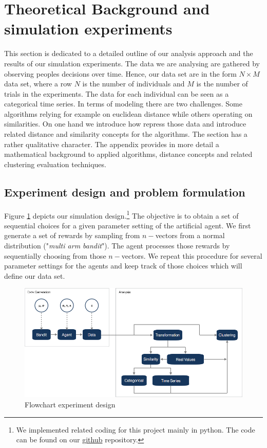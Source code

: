 \documentclass[12pt,a4paper,bibliography=totocnumbered,listof=totocnumbered]{scrartcl}
\begin{document}
\pagebreak

\section{Theoretical Background and simulation experiments}

This section is dedicated to a detailed outline of our analysis approach and the results of our simulation experiments. The data we are analysing are gathered by observing peoples decisions over time. Hence, our data set are in the form $N \times M$ data set, where a row $N$ is the number of individuals and $M$ is the number of trials in the experiments. The data for each individual can be seen as a categorical time series. In terms of modeling there are two challenges. Some algorithms relying for example on euclidean distance while others operating on similarities. On one hand we introduce how repress those data and introduce related distance and similarity concepts for the algorithms. The section has a rather qualitative character. The appendix provides in more detail a mathematical background to applied algorithms, distance concepts and related clustering evaluation techniques. 

\subsection{Experiment design and problem formulation}

Figure \ref{fig:flow} depicts our simulation design.\footnote{ We implemented related coding for this project mainly in python. The code can be found on our  \href{https://github.com/FelixGSE/Master-Project}{github} repository.} The objective is to obtain a set of sequential choices for a given parameter setting of the artificial agent. We first generate a set of rewards by sampling from $n-$vectors from a normal distribution ("\textit{multi arm bandit}"). The agent processes those rewards by sequentially choosing from those $n-$vectors.  We repeat this procedure for several parameter settings for the agents and keep track of those choices which will define our data set.

 \begin{figure}[!htb]
	\includegraphics[width=\textwidth]{Pictures/flow01.png}
	\caption{Flowchart experiment design}
	\label{fig:flow}
\end{figure}
\end{document}
